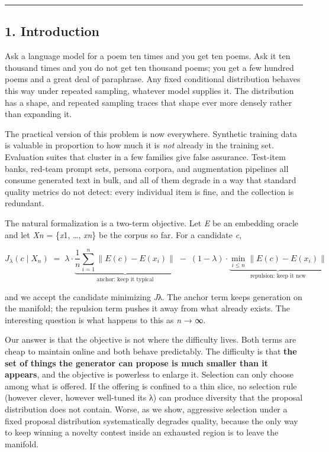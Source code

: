 \documentclass[
  11pt,
]{article}
\theoremstyle{plain}
\theoremstyle{definition}
\begin{document}
\begin{center}\rule{0.5\linewidth}{0.5pt}\end{center}

\subsection{1. Introduction}\label{1-introduction}

Ask a language model for a poem ten times and you get ten poems. Ask it
ten thousand times and you do not get ten thousand poems; you get a few
hundred poems and a great deal of paraphrase. Any fixed conditional
distribution behaves this way under repeated sampling, whatever model
supplies it. The distribution has a shape, and repeated sampling traces
that shape ever more densely rather than expanding it.

The practical version of this problem is now everywhere. Synthetic
training data is valuable in proportion to how much it is \emph{not}
already in the training set. Evaluation suites that cluster in a few
families give false assurance. Test-item banks, red-team prompt sets,
persona corpora, and augmentation pipelines all consume generated text
in bulk, and all of them degrade in a way that standard quality metrics
do not detect: every individual item is fine, and the collection is
redundant.

The natural formalization is a two-term objective. Let \emph{E} be an
embedding oracle and let \emph{Xn} = \{\emph{x}1, \ldots, \emph{xn}\} be
the corpus so far. For a candidate \emph{c},

\[
J_\lambda(c \mid X_n) \;=\; \lambda \cdot \underbrace{\frac{1}{n}\sum_{i=1}^{n}\lVert E(c) - E(x_i)\rVert}_{\text{anchor: keep it typical}} \;-\; (1-\lambda)\cdot \underbrace{\min_{i \le n} \lVert E(c) - E(x_i)\rVert}_{\text{repulsion: keep it new}}
\]

and we accept the candidate minimizing \emph{J}λ. The anchor term keeps
generation on the manifold; the repulsion term pushes it away from what
already exists. The interesting question is what happens to this as
\emph{n} → ∞.

Our answer is that the objective is not where the difficulty lives. Both
terms are cheap to maintain online and both behave predictably. The
difficulty is that \textbf{the set of things the generator can propose
is much smaller than it appears}, and the objective is powerless to
enlarge it. Selection can only choose among what is offered. If the
offering is confined to a thin slice, no selection rule (however clever,
however well-tuned its λ) can produce diversity that the proposal
distribution does not contain. Worse, as we show, aggressive selection
under a fixed proposal distribution systematically degrades quality,
because the only way to keep winning a novelty contest inside an
exhausted region is to leave the manifold.
\end{document}
